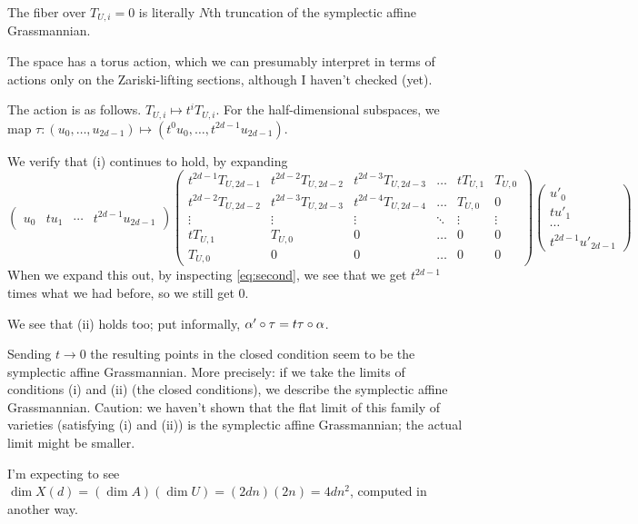 { 
 The fiber over $T_{U,i}=0$ is literally $N$th truncation of the symplectic affine Grassmannian.


The space has a torus action, which we can presumably interpret in terms
of actions only on the Zariski-lifting sections, although I haven't checked (yet).

The action is as follows.  $T_{U,i} \mapsto t^i T_{U,i}$.
For the half-dimensional subspaces,
we map $\tau: (u_0, \dots, u_{2d-1}) \mapsto (t^0 u_0, \dots, t^{2d-1} u_{2d-1})$.

We verify that (i) continues to hold, by expanding 
$$
\begin{pmatrix}
  u_0 & t u_1 & \cdots & t^{2d-1} u_{2d-1} \end{pmatrix}
 \begin{pmatrix}
t^{2d-1} T_{U,2d-1} & t^{2d-2}T_{U,2d-2} &  t^{2d-3} T_{U,2d-3} &  \hdots & t T_{U,1} & T_{U,0} \\
t^{2d-2}  T_{U,2d-2} &  t^{2d-3}T_{U,2d-3} & t^{2d-4}T_{U,2d-4} &  \hdots & T_{U,0} & 0 \\
   \vdots  & \vdots  &   \vdots  & \ddots & \vdots & \vdots \\
  t T_{U,1} & T_{U,0} & 0 & \hdots & 0 & 0 \\
   T_{U,0} & 0 & 0 & \hdots & 0 & 0 
  \end{pmatrix}
\begin{pmatrix}
  u'_0 \\ t u'_1 \\ \cdots \\ t^{2d-1} u'_{2d-1} \end{pmatrix}
$$
When we expand this out, by inspecting \eqref{eq:second}, we see that we get $t^{2d-1}$
times what we had before, so we still get $0$.

We see that (ii) holds too; put informally,  $\alpha' \circ \tau = t \tau \circ \alpha$.

 Sending $t \rightarrow 0$ the
resulting points in the closed condition
seem to be the symplectic affine Grassmannian.
More precisely:  if we take the limits of conditions (i) and (ii) (the closed conditions),
we describe the symplectic affine Grassmannian.  Caution:  we haven't shown that the flat limit of this family of varieties (satisfying (i) and (ii)) is the symplectic affine Grassmannian; the actual limit might be smaller.

I'm expecting to see $\dim X(d) = (\dim A) (\dim U) = (2dn)(2n) = 4dn^2$, computed in another way.


}
